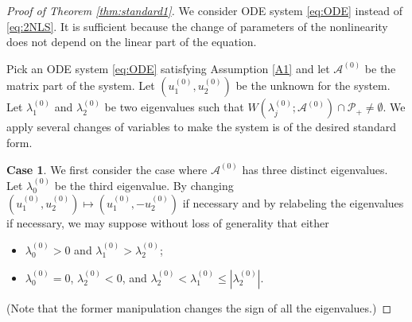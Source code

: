 \documentclass[11pt,a4paper,twosides]{amsart}
\theoremstyle{plain}
\theoremstyle{remark}
\numberwithin{equation}{section}
\def\le{\leqslant}
\theoremstyle{definition}
\newcommand{\1}{{\bf 1}_{\{|x| < |t|\}}}
\begin{document}
\begin{proof}[Proof of Theorem \ref{thm:standard1}]
We consider ODE system \eqref{eq:ODE} instead of \eqref{eq:2NLS}.
It is sufficient because the change of parameters of the nonlinearity does not depend on the linear part of the equation.

Pick an ODE system \eqref{eq:ODE} satisfying Assumption \ref{A1} and let
$\mathscr{A}^{(0)}$ be the matrix part of the system.
Let $(u_1^{(0)},u_2^{(0)})$ be the unknown for the system. 
Let $\lambda_1^{(0)}$ and $\lambda_2^{(0)}$ be two eigenvalues such that
$W(\lambda_j^{(0)};\mathscr{A}^{(0)}) \cap \mathcal{P}_+ \neq \emptyset$.
We apply several changes of variables to make the system is of the desired standard form.

{\bf Case 1}.
We first consider the case where $\mathscr{A}^{(0)}$ has three distinct eigenvalues.
Let $\lambda_0^{(0)}$ be the third eigenvalue.
By changing $(u_1^{(0)},u_2^{(0)})\mapsto (u_1^{(0)},-u_2^{(0)})$ if necessary and
 by relabeling the eigenvalues if necessary, we may suppose  without loss of generality that either
\begin{itemize}
\item[(a)] $\lambda_0^{(0)}>0$ and $\lambda_1^{(0)}>\lambda_2^{(0)}$;
\item[(b)] $\lambda_0^{(0)}=0$, $\lambda_2^{(0)}<0$, and $\lambda_2^{(0)}<\lambda_1^{(0)}\le |\lambda_2^{(0)}| $.
\end{itemize}
(Note that the former manipulation changes the sign of all the eigenvalues.)


\end{proof}
\end{document}
